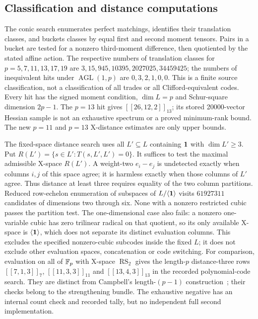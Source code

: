 \subsection{Classification and distance computations}
The conic search enumerates perfect matchings, identifies their translation
classes, and buckets classes by equal first and second moment tensors.
Pairs in a bucket are tested for a nonzero third-moment difference, then
quotiented by the stated affine action. The respective numbers of translation
classes for $p=5,7,11,13,17,19$ are
$3,15,945,10395,2027025,34459425$; the numbers of inequivalent hits under
$\operatorname{AGL}(1,p)$ are $0,3,2,1,0,0$.
This is a finite source classification, not a classification of all trades
or all Clifford-equivalent codes. Every hit has the signed moment condition,
$\dim L=p$ and Schur-square dimension $2p-1$.
The $p=13$ hit gives $[[26,12,2]]_{13}$; its stored 20000-vector Hessian
sample is not an exhaustive spectrum or a proved minimum-rank bound.
The new $p=11$ and $p=13$ X-distance estimates are only upper bounds.

The fixed-space distance search uses all $L'\subseteq L$ containing $\mathbf 1$
with $\dim L'\geq3$. Put
$R(L')=\{s\in L':T(s,L',L')=0\}$.
It suffices to test the maximal admissible X-space $R(L')$.
A weight-two $e_i-e_j$ is undetected exactly when columns $i,j$ of this
space agree; it is harmless exactly when those columns of $L'$ agree.
Thus distance at least three requires equality of the two column partitions.
Reduced row-echelon enumeration of subspaces of $L/\langle\mathbf 1\rangle$
visits $61927311$ candidates of dimensions two through six. None with a
nonzero restricted cubic passes the partition test. The one-dimensional
case also fails: a nonzero one-variable cubic has zero trilinear radical
on that quotient, so its only available X-space is $\langle\mathbf 1\rangle$,
which does not separate its distinct evaluation columns.
This excludes the specified nonzero-cubic subcodes inside the fixed $L$;
it does not exclude other evaluation spaces, concatenation or code switching.
For comparison, evaluation on all of $\mathbb F_p$ with X-space
$\operatorname{RS}_2$ gives the length-$p$ distance-three rows
$[[7,1,3]]_7$, $[[11,3,3]]_{11}$ and $[[13,4,3]]_{13}$ in the recorded
polynomial-code search. They are distinct from Campbell's length-$(p-1)$
construction~\cite{campbell2014}; their checks belong to the strengthening
bundle.
The exhaustive negative has an internal count check and recorded tally,
but no independent full second implementation.

